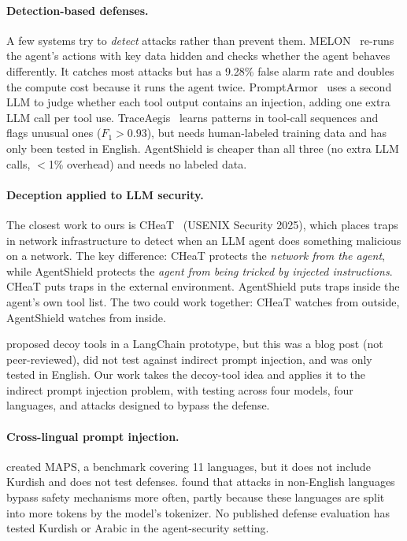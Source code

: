 \documentclass[preprint,12pt]{elsarticle}
\begin{document}
\paragraph{Detection-based defenses.}
A few systems try to \emph{detect} attacks rather than prevent them.
MELON~\citep{zhu2025melon} re-runs the agent's actions with key data hidden and checks whether the agent behaves differently.
It catches most attacks but has a 9.28\% false alarm rate and doubles the compute cost because it runs the agent twice.
PromptArmor~\citep{promptarmor2025} uses a second LLM to judge whether each tool output contains an injection, adding one extra LLM call per tool use.
TraceAegis~\citep{traceaegis2025} learns patterns in tool-call sequences and flags unusual ones ($F_1 > 0.93$), but needs human-labeled training data and has only been tested in English.
AgentShield is cheaper than all three (no extra LLM calls, $<$1\% overhead) and needs no labeled data.

\paragraph{Deception applied to LLM security.}
The closest work to ours is CHeaT~\citep{ayzenshteyn2025cloak} (USENIX Security 2025), which places traps in network infrastructure to detect when an LLM agent does something malicious on a network.
The key difference: CHeaT protects the \emph{network from the agent}, while AgentShield protects the \emph{agent from being tricked by injected instructions}.
CHeaT puts traps in the external environment. AgentShield puts traps inside the agent's own tool list.
The two could work together: CHeaT watches from outside, AgentShield watches from inside.

\citet{rabin2025cyberark} proposed decoy tools in a LangChain prototype, but this was a blog post (not peer-reviewed), did not test against indirect prompt injection, and was only tested in English.
Our work takes the decoy-tool idea and applies it to the indirect prompt injection problem, with testing across four models, four languages, and attacks designed to bypass the defense.

\paragraph{Cross-lingual prompt injection.}
\citet{hofman2026maps} created MAPS, a benchmark covering 11 languages, but it does not include Kurdish and does not test defenses. \citet{wang2023xsafety} found that attacks in non-English languages bypass safety mechanisms more often, partly because these languages are split into more tokens by the model's tokenizer. No published defense evaluation has tested Kurdish or Arabic in the agent-security setting.
\end{document}

